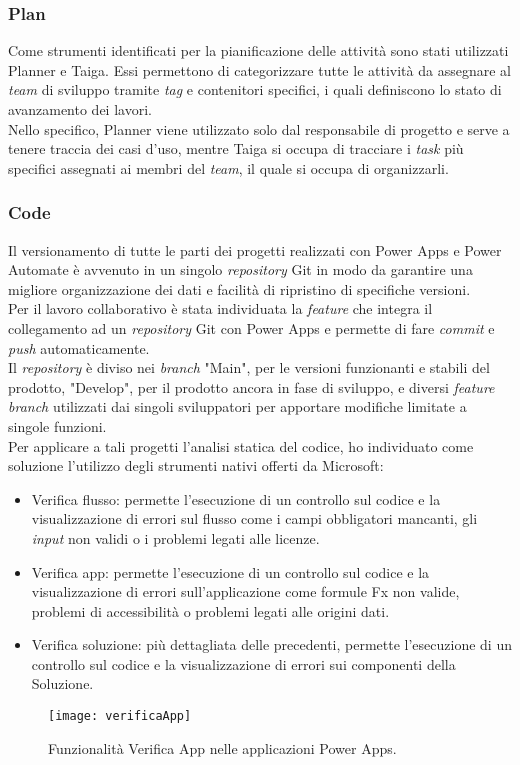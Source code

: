 \subsubsection*{Plan}
Come strumenti identificati per la pianificazione delle attività sono stati utilizzati Planner e Taiga.
Essi permettono di categorizzare tutte le attività da assegnare al \emph{team} di sviluppo tramite \emph{tag} e contenitori specifici, i quali definiscono lo stato di avanzamento dei lavori.\\
Nello specifico, Planner viene utilizzato solo dal responsabile di progetto e serve a tenere traccia dei casi d'uso, mentre Taiga si occupa di tracciare i \emph{task} più specifici assegnati ai membri del \emph{team}, il quale si occupa di organizzarli.

\subsubsection*{Code}
Il versionamento di tutte le parti dei progetti realizzati con Power Apps e Power Automate è avvenuto in un singolo \emph{repository} Git in modo da garantire una migliore organizzazione dei dati e facilità di ripristino di specifiche versioni.\\
Per il lavoro collaborativo è stata individuata la \emph{feature} che integra il collegamento ad un \emph{repository} Git con Power Apps e permette di fare \emph{commit} e \emph{push} automaticamente.\\
Il \emph{repository} è diviso nei \emph{branch} "Main", per le versioni funzionanti e stabili del prodotto, "Develop", per il prodotto ancora in fase di sviluppo, e diversi \emph{feature branch} utilizzati dai singoli sviluppatori per apportare modifiche limitate a singole funzioni.\\
Per applicare a tali progetti l'analisi statica del codice, ho individuato come soluzione l'utilizzo degli strumenti nativi offerti da Microsoft:
\begin{itemize}
    \item Verifica flusso: permette l'esecuzione di un controllo sul codice e la visualizzazione di errori sul flusso come i campi obbligatori mancanti, gli \emph{input} non validi o i problemi legati alle licenze. 
    \item Verifica app: permette l'esecuzione di un controllo sul codice e la visualizzazione di errori sull'applicazione come formule Fx non valide, problemi di accessibilità o problemi legati alle origini dati. 
    \item Verifica soluzione: più dettagliata delle precedenti, permette l'esecuzione di un controllo sul codice e la visualizzazione di errori sui componenti della Soluzione.
\end{itemize}
\begin{figure}[htbp] 
    \centering 
    \texttt{[image: verificaApp]} 
    \caption{Funzionalità Verifica App nelle applicazioni Power Apps.}
    \label{fig:verificaApp}
\end{figure}

